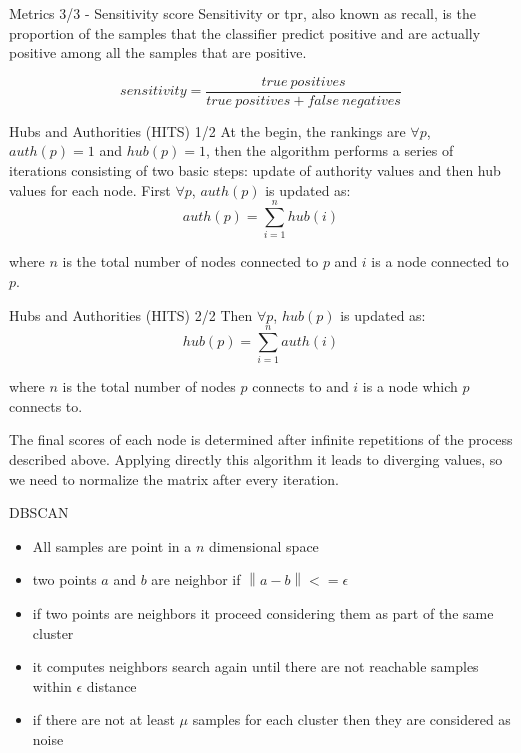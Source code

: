 \documentclass{beamer}
\begin{document}
	\begin{frame}{Metrics 3/3 - Sensitivity score}
		Sensitivity or \acrfull{tpr}, also known as recall, is the proportion of the samples that the classifier predict positive and are actually positive among all the samples that are positive. 
		
		$$sensitivity  = \frac{true\ positives}{true\ positives + false\ negatives}$$
	\end{frame}
	
	\begin{frame}{Hubs and Authorities (HITS) 1/2}	
		At the begin, the rankings are $\forall p$, $auth(p)=1$ and $hub(p)=1$, then the algorithm performs a series of iterations   consisting of two basic steps: update of authority values and then hub values for each node. First $\forall p$, $auth(p)$ is updated as:
		$$auth(p)=\sum_{i=1}^n hub(i)$$
		
		where $n$ is the total number of nodes connected to $p$ and $i$ is a node connected to $p$.
	\end{frame}
	
	\begin{frame}{Hubs and Authorities (HITS) 2/2}
		Then $\forall p$, $hub(p)$ is updated as:
		$$hub(p)=\sum_{i=1}^n auth(i)$$
		
		where $n$ is the total number of nodes $p$ connects to and $i$ is a node which $p$ connects to. 
		
		The final scores of each node is determined after infinite repetitions of the process described above. Applying directly this algorithm it leads to diverging values, so we need to normalize the matrix after every iteration.
	\end{frame}
	
	\begin{frame}{DBSCAN}
		\begin{itemize}
			\item All samples are point in a $n$ dimensional space
			\item two points $a$ and $b$ are neighbor if $ \left\| a - b \right\| <= \epsilon$
			\item if two points are neighbors it proceed considering them as part of the same cluster
			\item it computes neighbors search again until there are not reachable samples within $\epsilon$ distance
			\item if there are not at least $\mu$ samples for each cluster then they are considered as noise
		\end{itemize}
	\end{frame}
\end{document}
